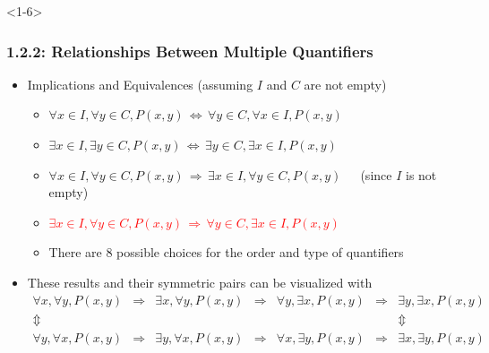 \documentclass[10pt,english,aspectratio=169]{beamer}
\begin{document}
\begin{frame}<1-6> \frametitle{1.2.2: Relationships Between Multiple Quantifiers}

\begin{itemize}
\setlength\itemsep{5mm}
\item<1-> Implications and Equivalences (assuming $I$ and $C$ are not empty) \vspace{1mm}
\begin{itemize}
 \setlength\itemsep{1.5mm}
 \item<1-> $\forall x\!\in\! I, \forall y\!\in\! C, P(x,y)  \,\Leftrightarrow\, \forall y\!\in\! C, \forall x\!\in\! I, P(x,y)$
 \item<2-> $\exists x\!\in\! I, \exists y\!\in\! C, P(x,y) \,\Leftrightarrow\, \exists y\!\in\! C, \exists x\!\in\! I, P(x,y)$
 \item<3-> $\forall x\!\in\! I, \forall y\!\in\! C, P(x,y) \,\Rightarrow\, \exists x\!\in\! I, \forall y\!\in\! C, P(x,y)$~~~(since $I$ is not empty)
 \item<4-> \textcolor{red}{$\exists x\!\in\! I, \forall y\!\in\! C, P(x,y) \,\Rightarrow\, \forall y\!\in\! C, \exists x\!\in\! I, P(x,y)$}
 \item<5-> There are 8 possible choices for the order and type of quantifiers
    
\end{itemize}

 \item<6-> These results and their symmetric pairs can be visualized with \\[-3mm] {\small \color{blue} \[ \begin{array}{ccccccc}
   \forall x, \forall y, P(x,y) & \Rightarrow & \exists x, \forall y, P(x,y) & \Rightarrow & \forall y, \exists x, P(x,y) & \Rightarrow & \exists y, \exists x, P(x,y) \\
   \Updownarrow &&&&&& \Updownarrow \\
   \forall y, \forall x, P(x,y) & \Rightarrow & \exists y, \forall x, P(x,y) & \Rightarrow & \forall x, \exists y, P(x,y) & \Rightarrow & \exists x, \exists y, P(x,y)
   \end{array} \]}

\end{itemize}


\end{frame}
\end{document}
